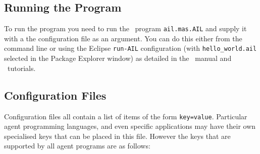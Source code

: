 \documentclass[a4]{article}
\begin{document}
\subsection{Running the Program}

To run the program you need to run the \java\ program \texttt{ail.mas.AIL} and supply it with a the configuration file as an argument.  You can do this either from the command line or using the Eclipse \texttt{run-AIL} configuration (with \texttt{hello\_world.ail} selected in the Package Explorer window) as detailed in the \mcapl\ manual and \ail\ tutorials.

\subsection{Configuration Files}
\label{sec:configuration}

Configuration files all contain a list of items of the form \texttt{key=value}.  Particular agent programming languages, and even specific applications may have their own specialised keys that can be placed in this file.  However the keys that are supported by all agent programs are as follows:
\end{document}
